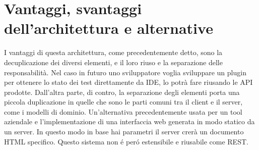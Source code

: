 \section{Vantaggi, svantaggi dell'architettura e alternative}
    I vantaggi di questa architettura, come precedentemente detto, sono la decuplicazione dei diversi elementi, e il loro riuso e la separazione delle responsabilità.
    Nel caso in futuro uno sviluppatore voglia sviluppare un plugin per ottenere lo stato dei test direttamente da IDE, lo potrà fare riusando le API prodotte.
    Dall'altra parte, di contro, la separazione degli elementi porta una piccola duplicazione in quelle che sono le parti comuni tra il client e il server, come i modelli di dominio.
    Un'alternativa precedentemente usata per un tool aziendale e l'implementazione di una interfaccia web generata in modo statico da un server.
    In questo modo in base hai parametri il  server crerà un documento HTML specifico.
    Questo sistema non \'e per\'o estensibile e riusabile come REST.
